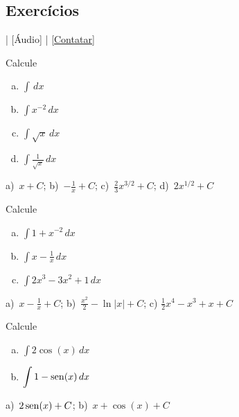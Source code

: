 \subsection{Exercícios}

\begin{flushright}
  [Vídeo] | [Áudio] | \href{https://phkonzen.github.io/notas/contato.html}{[Contatar]}
\end{flushright}

\begin{exer}
  Calcule
  \begin{enumerate}[a)]
  \item $\displaystyle \int \,dx$
  \item $\displaystyle \int x^{-2}\,dx$
  \item $\displaystyle \int \sqrt{x}\,dx$
  \item $\displaystyle \int \frac{1}{\sqrt{x}}\,dx$
  \end{enumerate}
\end{exer}
\begin{resp}
  a)~$\displaystyle x + C$; b)~$\displaystyle -\frac{1}{x} + C$; c)~$\displaystyle \frac{2}{3}x^{3/2} + C$; d)~$\displaystyle 2x^{1/2} + C$
\end{resp}

\begin{exer}
  Calcule
  \begin{enumerate}[a)]
  \item $\displaystyle \int 1 + x^{-2}\,dx$
  \item $\displaystyle \int x - \frac{1}{x}\,dx$
  \item $\displaystyle \int 2x^3 - 3x^2 + 1\,dx$
  \end{enumerate}
\end{exer}
\begin{resp}
  a)~$\displaystyle x-\frac{1}{x}+C$; b)~$\displaystyle \frac{x^2}{2} - \ln|x| + C$; c) $\displaystyle \frac{1}{2}x^4 - x^3 + x + C$
\end{resp}

\begin{exer}
  Calcule
  \begin{enumerate}[a)]
  \item $\displaystyle \int 2\cos(x)\,dx$
  \item $\displaystyle \int 1 - \operatorname{sen}(x)\,dx$
  \end{enumerate}
\end{exer}
\begin{resp}
  a)~$\displaystyle 2\operatorname{sen}(x) + C$; b)~$\displaystyle x + \cos(x) + C$
\end{resp}

